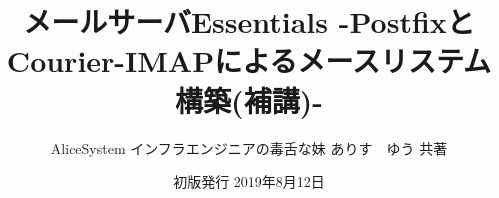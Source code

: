 \title{メールサーバEssentials -PostfixとCourier-IMAPによるメースリステム構築(補講)-}
\author{AliceSystem インフラエンジニアの毒舌な妹 ありす　ゆう 共著}
\date{初版発行 2019年8月12日}